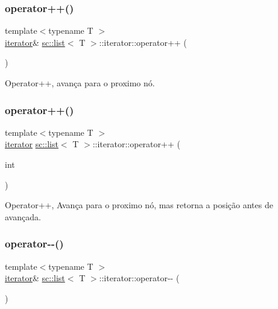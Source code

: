 \subsubsection{\texorpdfstring{operator++()}{operator++()}\hspace{0.1cm}{\footnotesize\ttfamily [1/2]}}
{\footnotesize\ttfamily template$<$typename T $>$ \\
\hyperlink{classsc_1_1list_1_1iterator}{iterator}\& \hyperlink{classsc_1_1list}{sc\+::list}$<$ T $>$\+::iterator\+::operator++ (\begin{DoxyParamCaption}{ }\end{DoxyParamCaption})\hspace{0.3cm}{\ttfamily [inline]}}

Operator++, avança para o proximo nó. \mbox{\label{classsc_1_1list_1_1iterator_aa4c960f7ec3b2914da2fdbf24ae18412}} 
\subsubsection{\texorpdfstring{operator++()}{operator++()}\hspace{0.1cm}{\footnotesize\ttfamily [2/2]}}
{\footnotesize\ttfamily template$<$typename T $>$ \\
\hyperlink{classsc_1_1list_1_1iterator}{iterator} \hyperlink{classsc_1_1list}{sc\+::list}$<$ T $>$\+::iterator\+::operator++ (\begin{DoxyParamCaption}\item[{int}]{ }\end{DoxyParamCaption})\hspace{0.3cm}{\ttfamily [inline]}}

Operator++, Avança para o proximo nó, mas retorna a posição antes de avançada. \mbox{\label{classsc_1_1list_1_1iterator_abf189d629eae1b86654039bc923f3979}} 
\subsubsection{\texorpdfstring{operator-\/-\/()}{operator--()}\hspace{0.1cm}{\footnotesize\ttfamily [1/2]}}
{\footnotesize\ttfamily template$<$typename T $>$ \\
\hyperlink{classsc_1_1list_1_1iterator}{iterator}\& \hyperlink{classsc_1_1list}{sc\+::list}$<$ T $>$\+::iterator\+::operator-\/-\/ (\begin{DoxyParamCaption}{ }\end{DoxyParamCaption})\hspace{0.3cm}{\ttfamily [inline]}}

